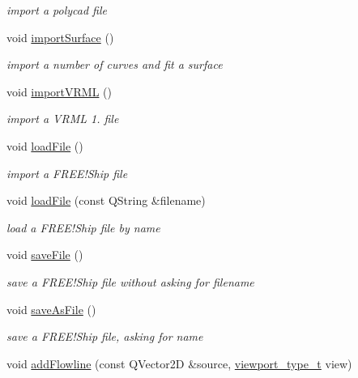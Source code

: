 \begin{DoxyCompactItemize}
\begin{DoxyCompactList}\small\item\em import a polycad file \end{DoxyCompactList}\item 
void \hyperlink{classShipCAD_1_1Controller_a229916f691507a3fa9393d0f9fbc1de5}{import\-Surface} ()
\begin{DoxyCompactList}\small\item\em import a number of curves and fit a surface \end{DoxyCompactList}\item 
void \hyperlink{classShipCAD_1_1Controller_a52d924f36259b6ec401acb6165922dc2}{import\-V\-R\-M\-L} ()
\begin{DoxyCompactList}\small\item\em import a V\-R\-M\-L 1. file \end{DoxyCompactList}\item 
void \hyperlink{classShipCAD_1_1Controller_ab2155421e40b1a2b19e79307aab7563b}{load\-File} ()
\begin{DoxyCompactList}\small\item\em import a F\-R\-E\-E!\-Ship file \end{DoxyCompactList}\item 
void \hyperlink{classShipCAD_1_1Controller_a7415bce07d64323be6b9d97885aa0875}{load\-File} (const Q\-String \&filename)
\begin{DoxyCompactList}\small\item\em load a F\-R\-E\-E!\-Ship file by name \end{DoxyCompactList}\item 
void \hyperlink{classShipCAD_1_1Controller_a4dbd04dffa55a42ec77f15d45909d55c}{save\-File} ()
\begin{DoxyCompactList}\small\item\em save a F\-R\-E\-E!\-Ship file without asking for filename \end{DoxyCompactList}\item 
void \hyperlink{classShipCAD_1_1Controller_aca904c26a74e79801deabfa8d863c92d}{save\-As\-File} ()
\begin{DoxyCompactList}\small\item\em save a F\-R\-E\-E!\-Ship file, asking for name \end{DoxyCompactList}\item 
void \hyperlink{classShipCAD_1_1Controller_a2f990373fed61bd7b586883a5e211bad}{add\-Flowline} (const Q\-Vector2\-D \&source, \hyperlink{namespaceShipCAD_aeeeb05810f2e31ef89fd4ac6b6ba9c0a}{viewport\-\_\-type\-\_\-t} view)

\end{DoxyCompactItemize}
